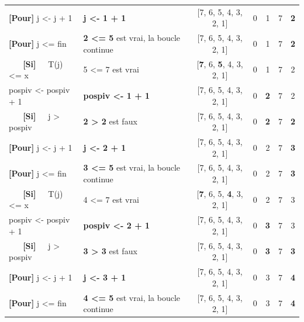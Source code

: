 \documentclass[10pt]{article} %
\newcommand{\asgold}[1]{\textcolor{mygold}{{\bf#1}}}
\newcommand{\asgr}[1]{\textcolor{mygreen}{{\bf#1}}}
\newcommand{\aspurp}[1]{\textcolor{mypurp}{{\bf#1}}}
\begin{document}
\begin{table}[h!]
\begin{tabular}{ll|ccccc}
    \asgr{[Pour]} j \textless{}- j + 1  &  \asgold{j \textless{}- 1 + 1}                                                              & {[}7, 6, 5, 4, 3, 2, 1{]} & 0      & 1      & 7 & \asgold{2} \\
    \asgr{[Pour]} j \textless{}= fin      & \aspurp{2 \textless{}= 5} est vrai, la boucle continue                 & {[}7, 6, 5, 4, 3, 2, 1{]} & 0      & 1      & 7 & \aspurp{2} \\
    \asgr{\ \ \ [Si]\ \ } T(j) \textless{}= x       & \cellcolor{mypurp} 5 \textless{}= 7 est vrai                                     & {[}\aspurp{7}, 6, \aspurp{5}, 4, 3, 2, 1{]} & 0      & 1      & 7 & 2 \\
    pospiv \textless{}- pospiv + 1  & \asgold{pospiv \textless{}- 1 + 1}               & {[}7, 6, 5, 4, 3, 2, 1{]} & 0      & \asgold{2}      & 7 & 2 \\
    \asgr{\ \ \ [Si]\ \ } j \textgreater{} pospiv     & \aspurp{2 \textgreater{} 2} est faux                                     & {[}7, 6, 5, 4, 3, 2, 1{]} & 0      & \aspurp{2}      & 7 & \aspurp{2} \\
    \asgr{[Pour]} j \textless{}- j + 1  &        \asgold{j \textless{}- 2 + 1}                                                        & {[}7, 6, 5, 4, 3, 2, 1{]} & 0      & 2      & 7 & \asgold{3} \\
    \asgr{[Pour]} j \textless{}= fin      & \aspurp{3 \textless{}= 5} est vrai, la boucle continue                 & {[}7, 6, 5, 4, 3, 2, 1{]} & 0      & 2      & 7 & \aspurp{3} \\
    \asgr{\ \ \ [Si]\ \ } T(j) \textless{}= x       & \cellcolor{mypurp} 4 \textless{}= 7 est vrai                                     & {[}\aspurp{7}, 6, 5, \aspurp{4}, 3, 2, 1{]} & 0      & 2      & 7 & 3 \\
    pospiv \textless{}- pospiv + 1  & \asgold{pospiv \textless{}- 2 + 1}               & {[}7, 6, 5, 4, 3, 2, 1{]} & 0      & \asgold{3}      & 7 & 3 \\
    \asgr{\ \ \ [Si]\ \ } j \textgreater{} pospiv     & \aspurp{3 \textgreater{} 3} est faux                                     & {[}7, 6, 5, 4, 3, 2, 1{]} & 0      & \aspurp{3}      & 7 & \aspurp{3} \\
    \asgr{[Pour]} j \textless{}- j + 1  &          \asgold{j \textless{}- 3 + 1}                                                      & {[}7, 6, 5, 4, 3, 2, 1{]} & 0      & 3      & 7 & \asgold{4} \\
    \asgr{[Pour]} j \textless{}= fin      & \aspurp{4 \textless{}= 5} est vrai, la boucle continue                 & {[}7, 6, 5, 4, 3, 2, 1{]} & 0      & 3      & 7 & \aspurp{4} \\

\end{tabular}
\end{table}
\end{document}
